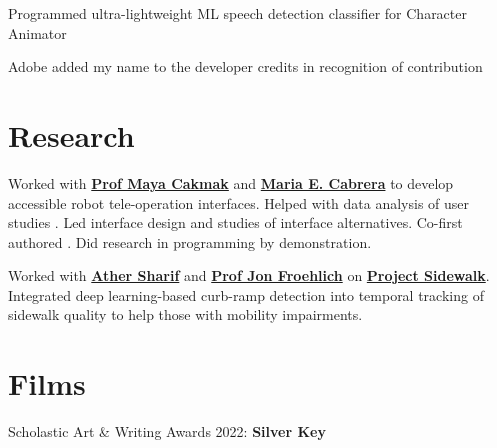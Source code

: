 \documentclass[]{deedy-long-resume}
\begin{document}
\begin{paracol}{2}
\begin{tightemize}
\item Programmed ultra-lightweight ML speech detection classifier for Character Animator
\item Adobe added my name to the developer credits in recognition of contribution
\end{tightemize}
\sectionsep


\section{Research}
Worked with \textbf{\href{https://homes.cs.washington.edu/~mcakmak/}{Prof Maya Cakmak}} and \textbf{\href{https://marucabrera.wixsite.com/homepage}{Maria E. Cabrera}} to develop accessible robot tele-operation interfaces. Helped with data analysis of user studies \cite{CabreraBDC21}. Led interface design and studies of interface alternatives. Co-first authored  \cite{CabreraDKBC21}. Did research in programming by demonstration.
\sectionsep

Worked with \textbf{\href{https://athersharif.me}{Ather Sharif}} and \textbf{\href{https://makeabilitylab.cs.washington.edu/member/jonfroehlich/}{Prof Jon Froehlich}} on \textbf{\href{https://makeabilitylab.cs.washington.edu/project/sidewalk/}{Project Sidewalk}}. Integrated deep learning-based curb-ramp detection into temporal tracking of sidewalk quality to help those with mobility impairments. \cite{SharifGSBFWDF21}
\sectionsep


\newpage 

\section{Films}
\begin{tightemize}
\item Scholastic Art \& Writing Awards 2022: \textbf{Silver Key}
\end{tightemize}
\sectionsep


\end{paracol}
\end{document}
